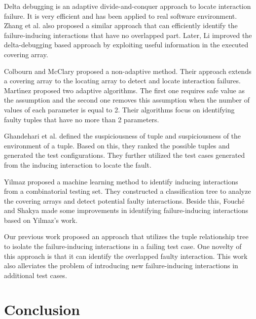 {Delta debugging \cite{zeller2002simplifying} is an adaptive divide-and-conquer approach to locate interaction failure. It is very efficient and has been applied to real software environment. Zhang et al. \cite{zhang2011characterizing} also proposed a similar approach that can efficiently identify the failure-inducing interactions that have no overlapped part. Later, Li \cite{li2012improved} improved the delta-debugging based approach by exploiting useful information in the executed covering array.

Colbourn and McClary \cite{colbourn2008locating} proposed a non-adaptive method. Their approach extends a covering array to the locating array to detect and locate interaction failures. Mart{\'\i}nez \cite{martinez2008algorithms,martinez2009locating} proposed two adaptive algorithms. The first one requires safe value as the assumption and the second one removes this assumption when the number of values of each parameter is equal to 2. Their algorithms focus on identifying faulty tuples that have no more than 2 parameters.

Ghandehari et al. \cite{ghandehari2012identifying} defined the suspiciousness of tuple and suspiciousness of the environment of a tuple. Based on this, they ranked the possible tuples and generated the test configurations. They \cite{ghandehari2013fault} further utilized the test cases generated from the inducing interaction to locate the fault.

Yilmaz \cite{yilmaz2006covering} proposed a machine learning method to identify inducing interactions from a combinatorial testing set. They constructed a classification tree to analyze the covering arrays and detect potential faulty interactions. Beside this, Fouch{\'e} \cite{fouche2009incremental} and Shakya \cite{shakya2012isolating} made some improvements in identifying failure-inducing interactions based on Yilmaz's work.

Our previous work \cite{niu2013identifying} proposed an approach that utilizes the tuple relationship tree to isolate the failure-inducing interactions in a failing test case. One novelty of this approach is that it can identify the overlapped faulty interaction. This work also alleviates the problem of introducing new failure-inducing interactions in additional test cases.




\section{Conclusion}\label{sec:conclusion}


}
